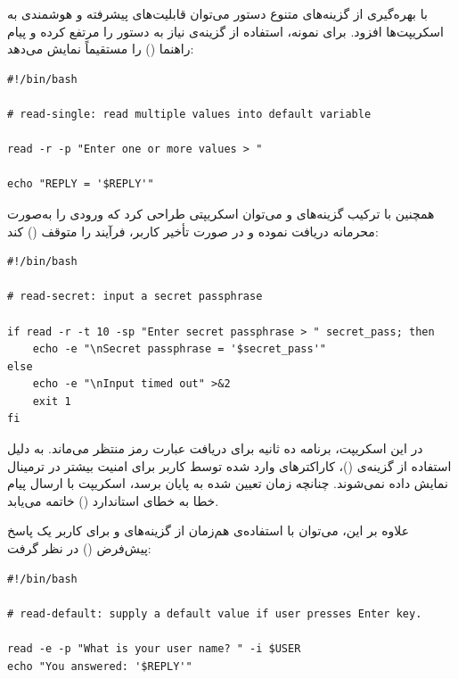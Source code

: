 با بهره‌گیری از گزینه‌های متنوع دستور  می‌توان قابلیت‌های پیشرفته و هوشمندی به اسکریپت‌ها افزود. برای نمونه، استفاده از گزینه‌ی  نیاز به دستور  را مرتفع کرده و پیام راهنما () را مستقیماً نمایش می‌دهد:

\begin{latin}
\begin{lstlisting}
#!/bin/bash

# read-single: read multiple values into default variable

read -r -p "Enter one or more values > "

echo "REPLY = '$REPLY'"
\end{lstlisting}
\end{latin}

همچنین با ترکیب گزینه‌های  و  می‌توان اسکریپتی طراحی کرد که ورودی را به‌صورت محرمانه دریافت نموده و در صورت تأخیر کاربر، فرآیند را متوقف () کند:

\begin{latin}
\begin{lstlisting}
#!/bin/bash

# read-secret: input a secret passphrase

if read -r -t 10 -sp "Enter secret passphrase > " secret_pass; then
    echo -e "\nSecret passphrase = '$secret_pass'"
else
    echo -e "\nInput timed out" >&2
    exit 1
fi
\end{lstlisting}
\end{latin}

در این اسکریپت، برنامه ده ثانیه برای دریافت عبارت رمز منتظر می‌ماند. به دلیل استفاده از گزینه‌ی  ()، کاراکترهای وارد شده توسط کاربر برای امنیت بیشتر در ترمینال نمایش داده نمی‌شوند. چنانچه زمان تعیین شده به پایان برسد، اسکریپت با ارسال پیام خطا به خطای استاندارد () خاتمه می‌یابد.

علاوه بر این، می‌توان با استفاده‌ی هم‌زمان از گزینه‌های  و  برای کاربر یک پاسخ پیش‌فرض () در نظر گرفت:

\begin{latin}
\begin{lstlisting}
#!/bin/bash

# read-default: supply a default value if user presses Enter key.

read -e -p "What is your user name? " -i $USER
echo "You answered: '$REPLY'"
\end{lstlisting}
\end{latin}

